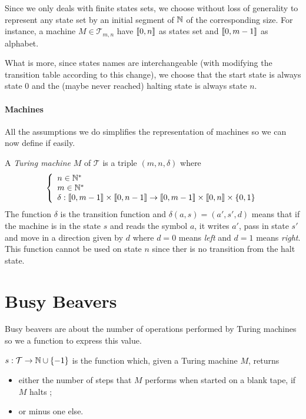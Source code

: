 \documentclass{report}
\begin{document}
Since we only deals with finite states sets, we choose without loss of generality to represent any state set by an initial segment of $\mathbb{N}$ of the corresponding size. For instance, a machine $M \in \mathcal{T}_{m,n}$ have $\llbracket 0, n \rrbracket$ as states set and $\llbracket 0, m-1 \rrbracket$ as alphabet.

What is more, since states names are interchangeable (with modifying the transition table according to this change), we choose that the start state is always state $0$ and the (maybe never reached) halting state is always state $n$.



\paragraph{Machines}
All the assumptions we do simplifies the representation of machines so we can now define if easily.

\begin{Def}

A \emph{Turing machine} $M$ of $\mathcal{T}$ is a triple $(m,n,\delta)$ where 
\[
\left \{
\begin{array}{l}
  n \in \mathbb{N}^*\\
  m \in \mathbb{N}^*\\
  \delta : \llbracket 0, m-1 \rrbracket \times \llbracket 0, n-1 \rrbracket \to \llbracket 0, m-1 \rrbracket \times \llbracket 0, n \rrbracket \times \{0,1\}
\end{array}
\right .
\]
The function $\delta$ is the transition function and $\delta(a, s) = (a', s', d)$ means that if the machine is in the state $s$ and reads the symbol $a$, it writes $a'$, pass in state $s'$ and move in a direction given by $d$ where $d = 0$ means \emph{left} and $d = 1$ means \emph{right}. This function cannot be used on state $n$ since ther is no transition from the halt state.  
\end{Def}


\section{Busy Beavers}
\label{sec:bb}

Busy beavers are about the number of operations performed by Turing machines so we a function to express this value.
\begin{Def}[$s$ function]
  $s : \mathcal{T} \to \mathbb{N} \cup \{-1\}$ is the function which, given a Turing machine $M$, returns
  \begin{itemize}
  \item either the number of steps that $M$ performs when started on a blank tape, if $M$ halts ;
  \item or minus one else.
  \end{itemize}
\end{Def}
\end{document}
